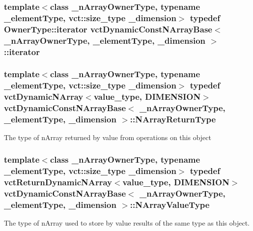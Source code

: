 \subsubsection[{iterator}]{\setlength{\rightskip}{0pt plus 5cm}template$<$class \+\_\+n\+Array\+Owner\+Type, typename \+\_\+element\+Type, vct\+::size\+\_\+type \+\_\+dimension$>$ typedef Owner\+Type\+::iterator {\bf vct\+Dynamic\+Const\+N\+Array\+Base}$<$ \+\_\+n\+Array\+Owner\+Type, \+\_\+element\+Type, \+\_\+dimension $>$\+::{\bf iterator}}\label{classvct_dynamic_const_n_array_base_a0d7eee16dd05c2f5757640b3617cac5d}
\hypertarget{classvct_dynamic_const_n_array_base_a7507402a90022d7a14ad7038fac07041}{}
\subsubsection[{N\+Array\+Return\+Type}]{\setlength{\rightskip}{0pt plus 5cm}template$<$class \+\_\+n\+Array\+Owner\+Type, typename \+\_\+element\+Type, vct\+::size\+\_\+type \+\_\+dimension$>$ typedef {\bf vct\+Dynamic\+N\+Array}$<$value\+\_\+type, {\bf D\+I\+M\+E\+N\+S\+I\+O\+N}$>$ {\bf vct\+Dynamic\+Const\+N\+Array\+Base}$<$ \+\_\+n\+Array\+Owner\+Type, \+\_\+element\+Type, \+\_\+dimension $>$\+::{\bf N\+Array\+Return\+Type}}\label{classvct_dynamic_const_n_array_base_a7507402a90022d7a14ad7038fac07041}
The type of n\+Array returned by value from operations on this object \hypertarget{classvct_dynamic_const_n_array_base_a40632d0d6ab17d8fc3ea2097f889bffa}{}
\subsubsection[{N\+Array\+Value\+Type}]{\setlength{\rightskip}{0pt plus 5cm}template$<$class \+\_\+n\+Array\+Owner\+Type, typename \+\_\+element\+Type, vct\+::size\+\_\+type \+\_\+dimension$>$ typedef {\bf vct\+Return\+Dynamic\+N\+Array}$<$value\+\_\+type, {\bf D\+I\+M\+E\+N\+S\+I\+O\+N}$>$ {\bf vct\+Dynamic\+Const\+N\+Array\+Base}$<$ \+\_\+n\+Array\+Owner\+Type, \+\_\+element\+Type, \+\_\+dimension $>$\+::{\bf N\+Array\+Value\+Type}}\label{classvct_dynamic_const_n_array_base_a40632d0d6ab17d8fc3ea2097f889bffa}
The type of n\+Array used to store by value results of the same type as this object. \hypertarget{classvct_dynamic_const_n_array_base_aad4328d01dc43be4b9047d594ed2ae8d}{}
